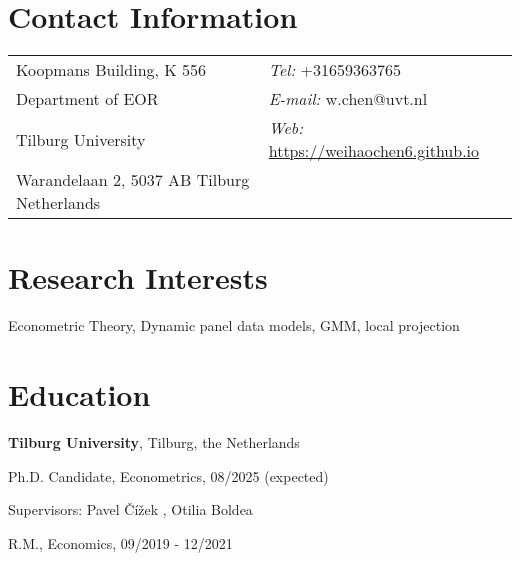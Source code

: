 \documentclass[margin,line]{res}
\newenvironment{list1}{
  \begin{list}{\ding{113}}{%
      \setlength{\itemsep}{0in}
      \setlength{\parsep}{0in} \setlength{\parskip}{0in}
      \setlength{\topsep}{0in} \setlength{\partopsep}{0in} 
      \setlength{\leftmargin}{0.17in}}}{\end{list}}
\begin{document}

\begin{resume}
\section{\sc Contact Information}
\vspace{.05in}
\begin{tabular}{@{}p{2in}p{4in}}
Koopmans Building, K 556     & {\it Tel:}  +31659363765 \\            
Department of EOR   &  {\it E-mail:}  w.chen@uvt.nl\\         
Tilburg University &{\it Web:} \url{https://weihaochen6.github.io} \\       
Warandelaan 2, 5037 AB Tilburg Netherlands  & \\     
\end{tabular}

\section{\sc Research Interests}
Econometric Theory, Dynamic panel data models, GMM, local projection
\section{\sc Education}
{\bf Tilburg University}, Tilburg, the Netherlands\\
\vspace*{-.1in}
\begin{list1}
\item[] Ph.D. Candidate, Econometrics, 08/2025 (expected) 
\vspace*{.05in}
\item[] Supervisors:  Pavel \v{C}\'{i}\v{z}ek
, Otilia Boldea
%
%
\vspace*{.05in}
\item[] R.M., Economics,  09/2019 - 12/2021
\end{list1}


\end{resume}
\end{document}
